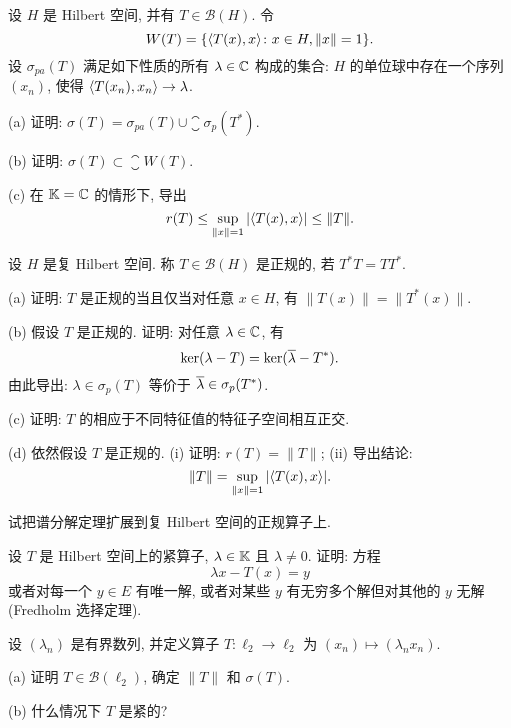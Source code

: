 \begin{exercise}
    设 $H$ 是 Hilbert 空间, 并有 $T\in\mathcal{B}(H)$. 令
    \[W(T)=\{\langle T(x),x\rangle\colon x\in H,\|x\|=1\}.\]
    设 $\sigma_{pa}(T)$ 满足如下性质的所有 $\lambda\in\mathbb{C}$ 构成的集合:
    $H$ 的单位球中存在一个序列 $(x_n)$, 使得 $\langle T(x_n),x_n\rangle\to\lambda$.

    (a) 证明: $\sigma(T)=\sigma_{pa}(T)\cup\closure{\sigma_p(T^*)}$.

    (b) 证明: $\sigma(T)\subset\closure{W(T)}$.

    (c) 在 $\mathbb{K}=\mathbb{C}$ 的情形下, 导出
    \[r(T)\leq\sup_{\|x\|=1}|\langle T(x),x\rangle|\leq\|T\|.\]
\end{exercise}



\begin{exercise}
    设 $H$ 是复 Hilbert 空间. 称 $T\in\mathcal{B}(H)$ 是正规的, 若 $T^*T=TT^*$.

    (a) 证明: $T$ 是正规的当且仅当对任意 $x\in H$, 有 $\|T(x)\|=\|T^*(x)\|$.

    (b) 假设 $T$ 是正规的. 证明: 对任意 $\lambda\in\mathbb{C}$, 有
    \[\ker(\lambda-T)=\ker(\overline{\lambda}-T^*).\]
    由此导出: $\lambda\in\sigma_p(T)$ 等价于 $\overline{\lambda}\in\sigma_p(T^*)$.

    (c) 证明: $T$ 的相应于不同特征值的特征子空间相互正交.

    (d) 依然假设 $T$ 是正规的.
    (i) 证明: $r(T)=\|T\|$; (ii) 导出结论:
    \[\|T\|=\sup_{\|x\|=1}|\langle T(x),x\rangle|.\]
\end{exercise}



\begin{exercise}
    试把谱分解定理扩展到复 Hilbert 空间的正规算子上.
\end{exercise}



\begin{exercise}
    设 $T$ 是 Hilbert 空间上的紧算子, $\lambda\in\mathbb{K}$ 且 $\lambda\neq 0$. 证明: 方程
    \[\lambda x-T(x)=y\]
    或者对每一个 $y\in E$ 有唯一解, 或者对某些 $y$ 有无穷多个解但对其他的 $y$ 无解(Fredholm 选择定理).
\end{exercise}



\begin{exercise}
    设 $(\lambda_n)$ 是有界数列, 并定义算子 $T:\ell_2\to\ell_2$ 为 $(x_n)\mapsto (\lambda_n x_n)$.

    (a) 证明 $T\in\mathcal{B}(\ell_2)$, 确定 $\|T\|$ 和 $\sigma(T)$.

    (b) 什么情况下 $T$ 是紧的?
\end{exercise}



